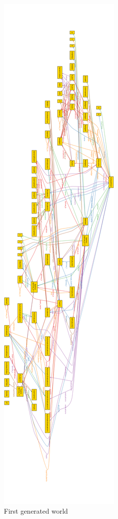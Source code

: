\begin{figure}[H]
    \centering
    \includegraphics[height=\textheight]{Images/alloy/alloy_gen_01.png}
    \caption{First generated world}
\end{figure}


